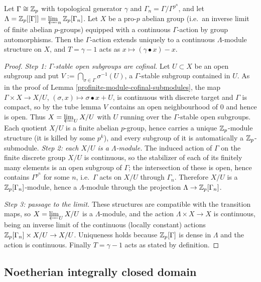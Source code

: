 \begin{prop}
\label{profinite-Gamma-module-is-Lambda-module}
Let $\Gamma\cong{\mathbb {Z}}_p$ with topological generator $\gamma$ and
$\Gamma_n=\Gamma/\Gamma^{p^n}$, and let $\Lambda={\mathbb {Z}}_p[[\Gamma]]
=\varprojlim_n{\mathbb {Z}}_p[\Gamma_n]$.
Let $X$ be a pro-$p$ abelian group (i.e.~an inverse limit of finite abelian
$p$-groups) equipped with a continuous $\Gamma$-action by group automorphisms.
Then the $\Gamma$-action extends uniquely to a continuous $\Lambda$-module
structure on $X$, and $T=\gamma-1$ acts as $x\mapsto(\gamma\bullet x)-x$.
\end{prop}

\begin{proof}
\emph{Step 1: $\Gamma$-stable open subgroups are cofinal.}
Let $U\subset X$ be an open subgroup and put
$V:=\bigcap_{\sigma\in\Gamma}\sigma^{-1}(U)$, a $\Gamma$-stable subgroup
contained in $U$.
As in the proof of Lemma \ref{profinite-module-cofinal-submodules}, the map
$\Gamma\times X\to X/U$, $(\sigma,x)\mapsto\sigma\bullet x+U$, is continuous
with discrete target and $\Gamma$ is compact, so by the tube lemma $V$ contains
an open neighbourhood of $0$ and hence is open.
Thus $X=\varprojlim_UX/U$ with $U$ running over the $\Gamma$-stable open
subgroups.
Each quotient $X/U$ is a finite abelian $p$-group, hence carries a unique
${\mathbb {Z}}_p$-module structure (it is killed by some $p^k$), and every subgroup of it
is automatically a ${\mathbb {Z}}_p$-submodule.
\emph{Step 2: each $X/U$ is a $\Lambda$-module.}
The induced action of $\Gamma$ on the finite discrete group $X/U$ is
continuous, so the stabilizer of each of its finitely many elements is an open
subgroup of $\Gamma$; the intersection of these is open, hence contains
$\Gamma^{p^n}$ for some $n$, i.e.~$\Gamma$ acts on $X/U$ through
$\Gamma_n$.
Therefore $X/U$ is a ${\mathbb {Z}}_p[\Gamma_n]$-module, hence a $\Lambda$-module through
the projection $\Lambda\to{\mathbb {Z}}_p[\Gamma_n]$.

\emph{Step 3: passage to the limit.}
These structures are compatible with the transition maps, so
$X=\varprojlim_UX/U$ is a $\Lambda$-module, and the action
$\Lambda\times X\to X$ is continuous, being an inverse limit of the continuous
(locally constant) actions ${\mathbb {Z}}_p[\Gamma_n]\times X/U\to X/U$.
Uniqueness holds because ${\mathbb {Z}}_p[\Gamma]$ is dense in $\Lambda$ and the action
is continuous.
Finally $T=\gamma-1$ acts as stated by definition.
\end{proof}

\subsection{Noetherian integrally closed domain}

